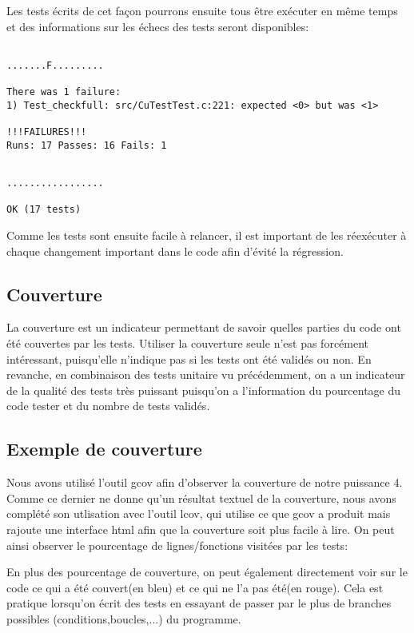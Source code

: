 \documentclass{report}
\begin{document}
Les tests écrits de cet façon pourrons ensuite tous être exécuter en même temps et des informations sur les échecs des tests seront disponibles:


\begin{lstlisting}

.......F.........

There was 1 failure:
1) Test_checkfull: src/CuTestTest.c:221: expected <0> but was <1>

!!!FAILURES!!!
Runs: 17 Passes: 16 Fails: 1

\end{lstlisting}
\begin{lstlisting}

.................

OK (17 tests)
\end{lstlisting}

Comme les tests sont ensuite facile à relancer, il est important de les réexécuter à chaque changement important dans le code afin d'évité la régression.

\subsection{Couverture}
La couverture est un indicateur permettant de savoir quelles parties du code ont été couvertes par les tests. Utiliser la couverture seule n'est pas forcément intéressant, puisqu'elle n'indique pas si les tests ont été validés ou non. En revanche, en combinaison des tests unitaire vu précédemment, on a un indicateur de la qualité des tests très puissant puisqu'on a l'information du pourcentage du code tester et du nombre de tests validés.
\subsection{Exemple de couverture}
Nous avons utilisé l'outil gcov afin d'observer la couverture de notre puissance 4. Comme ce dernier ne donne qu'un résultat textuel de la couverture, nous avons complété son utlisation avec l'outil lcov, qui utilise ce que gcov a produit mais rajoute une interface html afin que la couverture soit plus facile à lire. On peut ainsi observer le pourcentage de lignes/fonctions visitées par les tests:

En plus des pourcentage de couverture, on peut également directement voir sur le code ce qui a été couvert(en bleu) et ce qui ne l'a pas été(en rouge). Cela est pratique lorsqu'on écrit des tests en essayant de passer par le plus de branches possibles (conditions,boucles,...) du programme.
\end{document}
